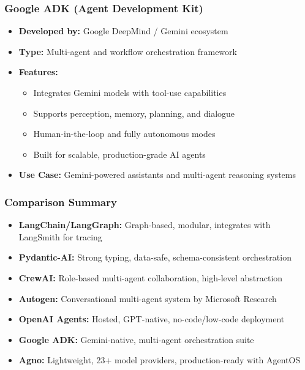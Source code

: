 \begin{frame}[fragile]\frametitle{Google ADK (Agent Development Kit)}
    \begin{itemize}
        \item \textbf{Developed by:} Google DeepMind / Gemini ecosystem
        \item \textbf{Type:} Multi-agent and workflow orchestration framework
        \item \textbf{Features:}
              \begin{itemize}
                  \item Integrates Gemini models with tool-use capabilities
                  \item Supports perception, memory, planning, and dialogue
                  \item Human-in-the-loop and fully autonomous modes
                  \item Built for scalable, production-grade AI agents
              \end{itemize}
        \item \textbf{Use Case:} Gemini-powered assistants and multi-agent reasoning systems
    \end{itemize}
\end{frame}

\begin{frame}[fragile]\frametitle{Comparison Summary}
    \begin{itemize}
        \item \textbf{LangChain/LangGraph:} Graph-based, modular, integrates with LangSmith for tracing
        \item \textbf{Pydantic-AI:} Strong typing, data-safe, schema-consistent orchestration
        \item \textbf{CrewAI:} Role-based multi-agent collaboration, high-level abstraction
        \item \textbf{Autogen:} Conversational multi-agent system by Microsoft Research
        \item \textbf{OpenAI Agents:} Hosted, GPT-native, no-code/low-code deployment
        \item \textbf{Google ADK:} Gemini-native, multi-agent orchestration suite
        \item \textbf{Agno:} Lightweight, 23+ model providers, production-ready with AgentOS
    \end{itemize}
\end{frame}
